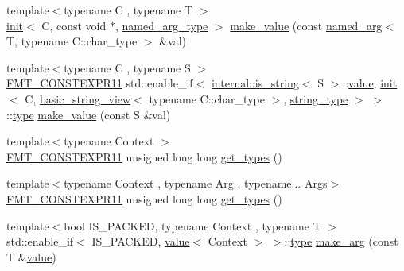 \begin{DoxyCompactItemize}
\item 
{\footnotesize template$<$typename C , typename T $>$ }\\\hyperlink{structinternal_1_1init}{init}$<$ C, const void $\ast$, \hyperlink{namespaceinternal_a8661864098ac0acff9a6dd7e66f59038a13dabc37bdc511ad896d2524ef1779d4}{named\+\_\+arg\+\_\+type} $>$ \hyperlink{namespaceinternal_a79837815bee11b56f801442c7e5b2742}{make\+\_\+value} (const \hyperlink{structinternal_1_1named__arg}{named\+\_\+arg}$<$ T, typename C\+::char\+\_\+type $>$ \&val)
\item 
{\footnotesize template$<$typename C , typename S $>$ }\\\hyperlink{core_8h_a056f29fbe3ea234ac0cc417fb866a189}{F\+M\+T\+\_\+\+C\+O\+N\+S\+T\+E\+X\+P\+R11} std\+::enable\+\_\+if$<$ \hyperlink{structinternal_1_1is__string}{internal\+::is\+\_\+string}$<$ S $>$\+::\hyperlink{classinternal_1_1value}{value}, \hyperlink{structinternal_1_1init}{init}$<$ C, \hyperlink{classbasic__string__view}{basic\+\_\+string\+\_\+view}$<$ typename C\+::char\+\_\+type $>$, \hyperlink{namespaceinternal_a8661864098ac0acff9a6dd7e66f59038a8a104d760e6ea540da0d654ca8728d55}{string\+\_\+type} $>$ $>$\+::\hyperlink{namespaceinternal_a8661864098ac0acff9a6dd7e66f59038}{type} \hyperlink{namespaceinternal_a3762125b750d86d353134984d7049419}{make\+\_\+value} (const S \&val)
\item 
{\footnotesize template$<$typename Context $>$ }\\\hyperlink{core_8h_a056f29fbe3ea234ac0cc417fb866a189}{F\+M\+T\+\_\+\+C\+O\+N\+S\+T\+E\+X\+P\+R11} unsigned long long \hyperlink{namespaceinternal_aaa50494fe4b84c4924ef9506709813e8}{get\+\_\+types} ()
\item 
{\footnotesize template$<$typename Context , typename Arg , typename... Args$>$ }\\\hyperlink{core_8h_a056f29fbe3ea234ac0cc417fb866a189}{F\+M\+T\+\_\+\+C\+O\+N\+S\+T\+E\+X\+P\+R11} unsigned long long \hyperlink{namespaceinternal_ac95af6018795359d47a7063b508fbd7b}{get\+\_\+types} ()
\item 
{\footnotesize template$<$bool I\+S\+\_\+\+P\+A\+C\+K\+ED, typename Context , typename T $>$ }\\std\+::enable\+\_\+if$<$ I\+S\+\_\+\+P\+A\+C\+K\+ED, \hyperlink{classinternal_1_1value}{value}$<$ Context $>$ $>$\+::\hyperlink{namespaceinternal_a8661864098ac0acff9a6dd7e66f59038}{type} \hyperlink{namespaceinternal_a04e85a8af8b4bd733c9e585ad3183aa5}{make\+\_\+arg} (const T \&\hyperlink{classinternal_1_1value}{value})
\item 

\end{DoxyCompactItemize}
